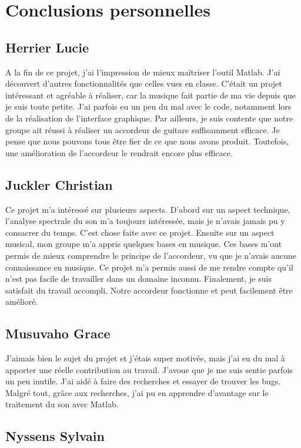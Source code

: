 \section{Conclusions personnelles}
\subsection{Herrier Lucie}
A la fin de ce projet, j'ai l'impression de mieux maîtriser l'outil Matlab. J'ai découvert d'autres fonctionnalités que celles vues en classe.  C'était un projet intéressant et agréable à réaliser, car la musique fait partie de ma vie depuis que je suis toute petite. J'ai parfois eu un peu du mal avec le code, notamment lors de la réalisation de l'interface graphique.
 Par ailleurs, je suis contente que notre groupe ait réussi à réaliser un accordeur de guitare suffisamment efficace. Je pense que nous pouvons tous être fier de ce que nous avons produit. Toutefois, une amélioration de l'accordeur le rendrait encore plus efficace.


\subsection{Juckler Christian}
Ce projet m'a intéressé sur plusieurs aspects. 
D'abord sur un aspect technique, l'analyse spectrale du son m'a toujours intéressée, mais je n'avais jamais pu y consacrer du temps. 
C'est chose faite avec ce projet.
Ensuite sur un aspect musical, mon groupe m'a appris quelques bases en musique.
Ces bases m'ont permis de mieux comprendre le principe de l'accordeur, vu que je n'avais aucune connaissance en musique.
Ce projet m'a permis aussi de me rendre compte qu'il n'est pas facile de travailler dans un domaine inconnu. 
Finalement, je suis satisfait du travail accompli. Notre accordeur fonctionne et peut facilement être amélioré.

\subsection{Musuvaho Grace}
J'aimais bien le sujet du projet et j'étais super motivée, mais j'ai eu du mal à apporter une réelle contribution au travail. J'avoue que je me suis sentie parfois un peu inutile. J'ai aidé à faire des recherches et essayer de trouver les bugs. Malgré tout, grâce aux recherches, j'ai pu en apprendre d'avantage sur le traitement du son avec Matlab.

\subsection{Nyssens Sylvain}